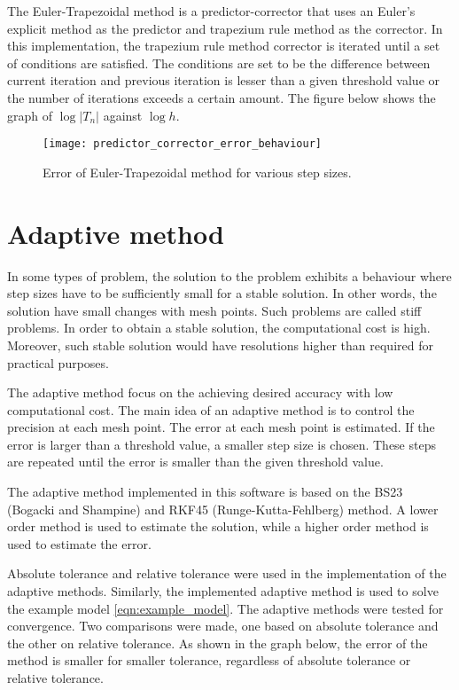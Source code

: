 The Euler-Trapezoidal method is a predictor-corrector that uses an Euler's explicit method as the predictor and trapezium rule method as the corrector. In this implementation, the trapezium rule method corrector is iterated until a set of conditions are satisfied. The conditions are set to be the difference between current iteration and previous iteration is lesser than a given threshold value or the number of iterations exceeds a certain amount. The figure below shows the graph of $\log |T_n|$ against $\log h$.

\begin{figure}
    \texttt{[image: predictor\_corrector\_error\_behaviour]}
    \caption{Error of Euler-Trapezoidal method for various step sizes.}
    \label{fig:predictor_corrector_error_behaviour}
\end{figure}

\section{Adaptive method}
\label{sec:adaptive-method}
In some types of problem, the solution to the problem exhibits a behaviour where step sizes have to be sufficiently small for a stable solution. In other words, the solution have small changes with mesh points. Such problems are called stiff problems. In order to obtain a stable solution, the computational cost is high. Moreover, such stable solution would have resolutions higher than required for practical purposes.

The adaptive method focus on the achieving desired accuracy with low computational cost. The main idea of an adaptive method is to control the precision at each mesh point. The error at each mesh point is estimated. If the error is larger than a threshold value, a smaller step size is chosen. These steps are repeated until the error is smaller than the given threshold value.

The adaptive method implemented in this software is based on the BS23 (Bogacki and Shampine) and RKF45 (Runge-Kutta-Fehlberg) method. A lower order method is used to estimate the solution, while a higher order method is used to estimate the error. 

Absolute tolerance and relative tolerance were used in the implementation of the adaptive methods. Similarly, the implemented adaptive method is used to solve the example model \ref{eqn:example_model}. The adaptive methods were tested for convergence. Two comparisons were made, one based on absolute tolerance and the other on relative tolerance. As shown in the graph below, the error of the method is smaller for smaller tolerance, regardless of absolute tolerance or relative tolerance.

